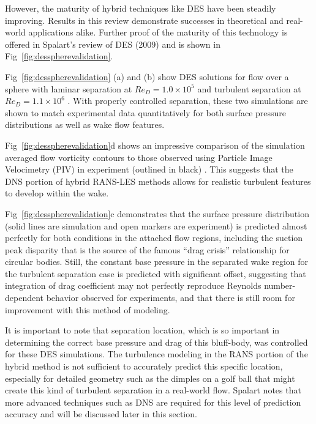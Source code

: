 \documentclass[journal]{new-aiaa}
\begin{document}
However, the maturity of hybrid techniques like DES have been steadily improving.  Results in this review demonstrate successes in theoretical and real-world applications alike. Further proof of the maturity of this technology is offered in Spalart's review of DES (2009) \cite{spalart2009detachededdy} and is shown in Fig~\ref{fig:desspherevalidation}.



Fig~\ref{fig:desspherevalidation} (a) and (b) show DES solutions for flow over a sphere with laminar separation at $Re_D = 1.0 \times 10^5$ and turbulent separation at $Re_D = 1.1 \times 10^6$ \cite{squires2004detachededdy}. With properly controlled separation, these two simulations are shown to match experimental data quantitatively for both surface pressure distributions as well as wake flow features.

Fig~\ref{fig:desspherevalidation}d shows an impressive comparison of the simulation averaged flow vorticity contours to those observed using Particle Image Velocimetry (PIV) in experiment (outlined in black) \cite{mockett2008demonstration}. This suggests that the DNS portion of hybrid RANS-LES methods allows for realistic turbulent features to develop within the wake.

Fig~\ref{fig:desspherevalidation}c demonstrates that the surface pressure distribution (solid lines are simulation and open markers are experiment) is predicted almost perfectly for both conditions in the attached flow regions, including the suction peak disparity that is the source of the famous ``drag crisis'' relationship for circular bodies. Still, the constant base pressure in the separated wake region for the turbulent separation case is predicted with significant offset, suggesting that integration of drag coefficient may not perfectly reproduce Reynolds number-dependent behavior observed for experiments, and that there is still room for improvement with this method of modeling.

It is important to note that separation location, which is so important in determining the correct base pressure and drag of this bluff-body, was controlled for these DES simulations. The turbulence modeling in the RANS portion of the hybrid method is not sufficient to accurately predict this specific location, especially for detailed geometry such as the dimples on a golf ball that might create this kind of turbulent separation in a real-world flow. Spalart notes that more advanced techniques such as DNS are required for this level of prediction accuracy and will be discussed later in this section.
\end{document}
